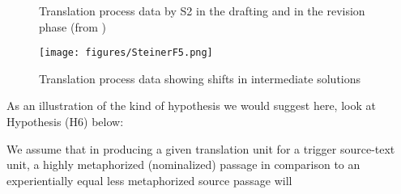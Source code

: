 \documentclass[output=paper]{LSP/langsci}
\begin{document}
\begin{exe}
\begin{exe}
\begin{exe}
\begin{exe}
\begin{exe}
 
\clearpage 

\begin{figure}
 \caption{Translation process data by S2 in the drafting and in the revision phase (from \citealt[131]{AlvesEtAl2010})}
 \label{fig:steiner:DraftingRevision}
\end{figure}

\begin{figure}
\texttt{[image: figures/SteinerF5.png]}
\caption{Translation process data showing shifts in intermediate solutions}
\label{fig:steiner:TranslationProcessData}
\end{figure} 

\clearpage

As an illustration of the kind of hypothesis we would suggest here, look at Hypothesis {(H6)} below:

\begin{exe}\label{hyp:steiner:6} 
We assume that in producing a given translation unit for a trigger source-text unit, a highly metaphorized (nominalized) passage in comparison to an experientially equal less metaphorized source passage will
\z


\end{exe}
\end{exe}
\end{exe}
\end{exe}
\end{exe}
\end{exe}
\end{document}
